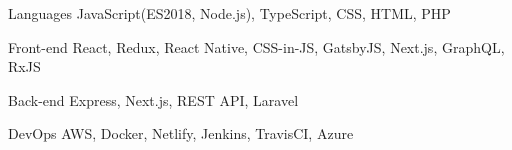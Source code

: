 

\begin{cvskills}

  \cvskill
    {Languages} %
    {JavaScript(ES2018, Node.js), TypeScript, CSS, HTML, PHP} %

  \cvskill
    {Front-end} %
    {React, Redux, React Native, CSS-in-JS, GatsbyJS, Next.js, GraphQL, RxJS} %

  \cvskill
    {Back-end} %
    {Express, Next.js, REST API, Laravel} %

  \cvskill
  {DevOps} %
  {AWS, Docker, Netlify, Jenkins, TravisCI, Azure} %

\end{cvskills}
